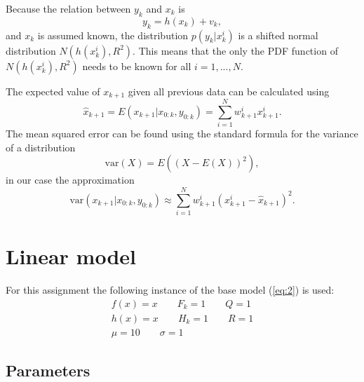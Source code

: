 \documentclass[paper=a4, fontsize=11pt]{scrartcl} %
\numberwithin{equation}{section} %
\numberwithin{figure}{section} %
\numberwithin{table}{section} %
\begin{document}
Because the relation between $y_k$ and $x_{k}$ is
$$
y_k=h(x_k) +v_k,
$$
and $x_k$ is assumed known, the distribution $p(y_k|x_k^i)$ is a shifted normal distribution $N\left(h(x_k^i),R^2\right)$. This means that the only the PDF function of $N\left(h(x_k^i),R^2\right)$ needs to be known for all $i=1,...,N$.

The expected value of $x_{k+1}$ given all previous data can be calculated using $$
\hat{x}_{k+1} = E(x_{k+1}|x_{0:k},y_{0:k})=\sum_{i=1}^N w_{k+1}^i x_{k+1}^i.
$$
The mean squared error can be found using the standard formula for the variance of a distribution $$
\text{var}(X) = E\left((X - E(X))^2\right),
$$
in our case the approximation
\begin{equation}\label{eq:1}
\text{var}(x_{k+1}|x_{0:k},y_{0:k}) \approx \sum_{i=1}^N w_{k+1}^i \left(x_{k+1}^i-\hat{x}_{k+1}\right)^2.
\end{equation}

\section{Linear model}

For this assignment the following instance of the base model (\ref{eq:2}) is used:
\begin{eqnarray*}
	f(x) = x \qquad F_k = 1 \qquad Q = 1 \\
	h(x) = x \qquad H_k = 1 \qquad R = 1 \\
	\mu = 10 \qquad \sigma = 1
\end{eqnarray*}

\subsection{Parameters}
\end{document}

